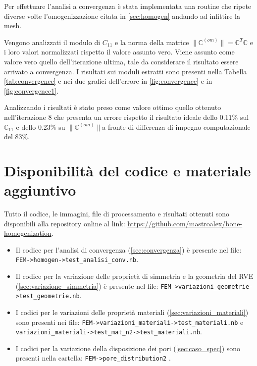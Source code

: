 \documentclass[a4paper,num-refs]{oup-contemporary}
\begin{document}
Per effettuare l'analisi a convergenza è stata implementata una routine che ripete diverse volte l'omogenizzazione citata in \cref{sec:homogen} andando ad infittire la mesh. 

Vengono analizzati il modulo di $C_{11}$ e la norma della matrice $\| \mathbb C^{(om)}\|=\mathbb C^T\mathbb C$ e i loro valori normalizzati rispetto il valore assunto vero. Viene assunto come valore vero quello dell'iterazione ultima, tale da considerare il risultato essere arrivato a convergenza. 
I risultati sui moduli estratti sono presenti nella Tabella \ref{tab:convergence} e nei due grafici dell'errore in \cref{fig:convergence} e in \cref{fig:convergence1}.

Analizzando i risultati è stato preso come valore ottimo quello ottenuto nell'iterazione 8 che presenta un errore rispetto il risultato ideale dello $0.11\%$ sul $\mathbb C_{11}$ e dello $0.23\%$ su $\|\mathbb C^{(om)}\|$a fronte di differenza di impegno computazionale del $83\%$. 





\section{Disponibilità del codice e materiale aggiuntivo}

Tutto il codice, le immagini, file di processamento e risultati ottenuti sono disponibili alla repository online al link: \url{https://github.com/mastroalex/bone-homogenization}. 
\begin{itemize}
	\item Il codice per l'analisi di convergenza (\cref{sec:convergenza}) è presente nel file: \texttt{FEM->homogen->test\_analisi\_conv.nb}.
	\item Il codice per la variazione delle proprietà di simmetria e la geometria del RVE (\cref{sec:variazione_simmetria}) è presente nel file:  \texttt{FEM->variazioni\_geometrie->test\_geometrie.nb}.
	\item I codici per le variazioni delle proprietà materiali (\cref{sec:variazioni_materiali}) sono presenti nei file: \texttt{FEM->variazioni\_materiali->test\_materiali.nb} e \texttt{variazioni\_materiali->test\_mat\_n2->test\_materiali.nb}.
	\item I codici per la variazione della disposizione dei pori (\cref{sec:caso_spec}) sono presenti nella cartella: \texttt{FEM->pore\_distribution2} .
	
\end{itemize}
\end{document}
